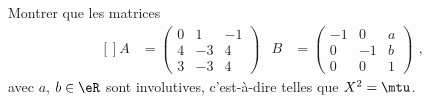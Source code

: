 \begin{exercice}\label{exoLineraire0007}

Montrer que les matrices
\begin{equation}
	\begin{aligned}[]
		A&=\begin{pmatrix}
  0	&	1	&	-1\\ 
  4	&	-3	&	4\\ 
 3	&	-3	& 4	  
\end{pmatrix}
	&B&=\begin{pmatrix}
  -1	&	0	&	a\\ 
  0	&	-1	&	b\\ 
 0	&	0	& 1	  
\end{pmatrix}
	\end{aligned},
\end{equation}
avec $a$, $b\in\eR$ sont involutives, c'est-à-dire telles que $X^2=\mtu$.


\end{exercice}
